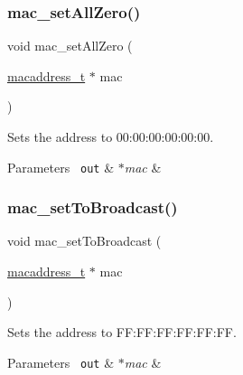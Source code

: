 \subsubsection{\texorpdfstring{mac\_setAllZero()}{mac\_setAllZero()}}
{\footnotesize\ttfamily void mac\+\_\+set\+All\+Zero (\begin{DoxyParamCaption}\item[{\mbox{\hyperlink{group__ethernet_gacb865bcbf50a6c8cef05581bfabff373}{macaddress\+\_\+t}} $\ast$}]{mac }\end{DoxyParamCaption})}



Sets the address to 00\+:00\+:00\+:00\+:00\+:00. 


\begin{DoxyParams}[1]{Parameters}
\mbox{\texttt{ out}}  & {\em $\ast$mac} & \\
\hline
\end{DoxyParams}
\mbox{\label{group__mac__operations_ga84ade37d84a21b67f68df8ee4928d7d4}} 
\subsubsection{\texorpdfstring{mac\_setToBroadcast()}{mac\_setToBroadcast()}}
{\footnotesize\ttfamily void mac\+\_\+set\+To\+Broadcast (\begin{DoxyParamCaption}\item[{\mbox{\hyperlink{group__ethernet_gacb865bcbf50a6c8cef05581bfabff373}{macaddress\+\_\+t}} $\ast$}]{mac }\end{DoxyParamCaption})}



Sets the address to F\+F\+:\+F\+F\+:\+F\+F\+:\+F\+F\+:\+FF\+:FF. 


\begin{DoxyParams}[1]{Parameters}
\mbox{\texttt{ out}}  & {\em $\ast$mac} & \\
\hline
\end{DoxyParams}
